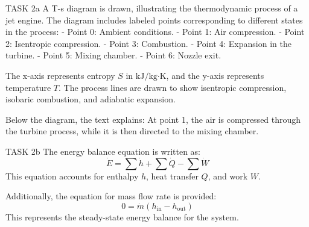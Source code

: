 TASK 2a  
A T-s diagram is drawn, illustrating the thermodynamic process of a jet engine. The diagram includes labeled points corresponding to different states in the process:  
- Point 0: Ambient conditions.  
- Point 1: Air compression.  
- Point 2: Isentropic compression.  
- Point 3: Combustion.  
- Point 4: Expansion in the turbine.  
- Point 5: Mixing chamber.  
- Point 6: Nozzle exit.  

The x-axis represents entropy \( S \) in \( \text{kJ/kg·K} \), and the y-axis represents temperature \( T \). The process lines are drawn to show isentropic compression, isobaric combustion, and adiabatic expansion.  

Below the diagram, the text explains:  
At point 1, the air is compressed through the turbine process, while it is then directed to the mixing chamber.  

TASK 2b  
The energy balance equation is written as:  
\[
\dot{E} = \sum \dot{h} + \sum \dot{Q} - \sum \dot{W}
\]  
This equation accounts for enthalpy \( h \), heat transfer \( Q \), and work \( W \).  

Additionally, the equation for mass flow rate is provided:  
\[
0 = \dot{m} (h_{\text{in}} - h_{\text{out}})
\]  
This represents the steady-state energy balance for the system.